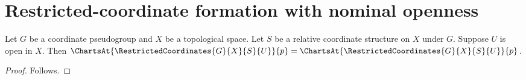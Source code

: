 \section{Restricted-coordinate formation with nominal openness}




\begin{theorem}\label{nominal_restricted_charts_at}
    Let $G$ be a coordinate pseudogroup and $X$ be a topological space.
    Let $S$ be a relative coordinate structure on $X$ under $G$.
    Suppose $U$ is open in $X$.
    Then $\ChartsAt{\RestrictedCoordinates{G}{X}{S}{U}}{p}
        =\ChartsAt{\RestrictedCoordinates{G}{X}{S}{U}}{p}$.
\end{theorem}
\begin{proof}
    Follows.
\end{proof}
